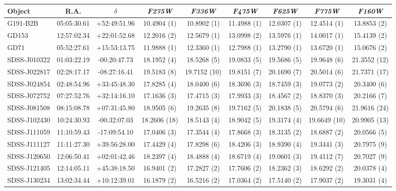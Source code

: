 \begin{table*}
\scriptsize
\begin{centering}
\begin{tabular}{l|cc|cccccc}
\hline
\hline
Object & R.A. & $\delta$  & \textit{F275W} & \textit{F336W} & \textit{F475W} & \textit{F625W} & \textit{F775W} & \textit{F160W} \\
\hline
G191-B2B & 05:05:30.61 & +52:49:51.96 & 10.4904 (1) & 10.8902 (1) & 11.4988 (1) & 12.0307 (1) & 12.4514 (1) & 13.8853 (2) \\
GD153 & 12:57:02.34 & +22:01:52.68 & 12.2016 (2) & 12.5679 (1) & 13.0998 (2) & 13.5976 (1) & 14.0017 (1) & 15.4139 (2) \\
GD71 & 05:52:27.61 & +15:53:13.75 & 11.9888 (1) & 12.3360 (1) & 12.7988 (1) & 13.2790 (1) & 13.6720 (1) & 15.0676 (2) \\
\hline
SDSS-J010322 & 01:03:22.19 & -00:20:47.73 & 18.1952 (4) & 18.5268 (5) & 19.0833 (5) & 19.5686 (5) & 19.9648 (6) & 21.3552 (12) \\
SDSS-J022817 & 02:28:17.17 & -08:27:16.41 & 19.5183 (8) & 19.7152 (10) & 19.8151 (7) & 20.1690 (7) & 20.5014 (6) & 21.7371 (17) \\
SDSS-J024854 & 02:48:54.96 & +33:45:48.30 & 17.8285 (4) & 18.0400 (6) & 18.3696 (3) & 18.7459 (3) & 19.0773 (2) & 20.3400 (6) \\
SDSS-J072752 & 07:27:52.76 & +32:14:16.10 & 17.1636 (3) & 17.4715 (3) & 17.9933 (3) & 18.4567 (2) & 18.8370 (3) & 20.2166 (7) \\
SDSS-J081508 & 08:15:08.78 & +07:31:45.80 & 18.9505 (6) & 19.2635 (8) & 19.7162 (5) & 20.1838 (5) & 20.5794 (6) & 21.9616 (24) \\
SDSS-J102430 & 10:24:30.93 & -00:32:07.03 & 18.2606 (18) & 18.5143 (4) & 18.9042 (5) & 19.3174 (4) & 19.6649 (10) & 20.9905 (13) \\
SDSS-J111059 & 11:10:59.43 & -17:09:54.10 & 17.0406 (3) & 17.3544 (4) & 17.8668 (3) & 18.3135 (2) & 18.6887 (2) & 20.0566 (5) \\
SDSS-J111127 & 11:11:27.30 & +39:56:28.00 & 17.4429 (4) & 17.8298 (6) & 18.4206 (3) & 18.9390 (4) & 19.3441 (3) & 20.7975 (9) \\
SDSS-J120650 & 12:06:50.41 & +02:01:42.46 & 18.2397 (4) & 18.4888 (4) & 18.6719 (4) & 19.0601 (3) & 19.4112 (7) & 20.7027 (9) \\
SDSS-J121405 & 12:14:05.11 & +45:38:18.50 & 16.9401 (2) & 17.2827 (2) & 17.7606 (2) & 18.2362 (3) & 18.6292 (2) & 20.0378 (4) \\
SDSS-J130234 & 13:02:34.44 & +10:12:39.01 & 16.1879 (2) & 16.5216 (2) & 17.0364 (2) & 17.5140 (2) & 17.9037 (2) & 19.3031 (4) \\

\end{tabular}
\end{centering}
\end{table*}
